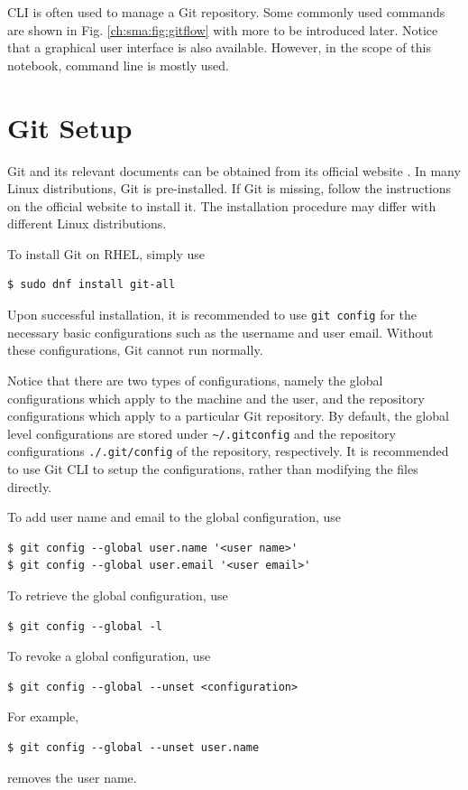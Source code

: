 CLI is often used to manage a Git repository. Some commonly used commands are shown in Fig. \ref{ch:sma:fig:gitflow} with more to be introduced later. Notice that a graphical user interface is also available. However, in the scope of this notebook, command line is mostly used.

\section{Git Setup}

Git and its relevant documents can be obtained from its official website \cite{git2025}. In many Linux distributions, Git is pre-installed. If Git is missing, follow the instructions on the official website to install it. The installation procedure may differ with different Linux distributions.

To install Git on RHEL, simply use
\begin{lstlisting}
$ sudo dnf install git-all
\end{lstlisting}

Upon successful installation, it is recommended to use \verb|git config| for the necessary basic configurations such as the username and user email. Without these configurations, Git cannot run normally.

Notice that there are two types of configurations, namely the global configurations which apply to the machine and the user, and the repository configurations which apply to a particular Git repository. By default, the global level configurations are stored under \verb|~/.gitconfig| and the repository configurations \verb|./.git/config| of the repository, respectively. It is recommended to use Git CLI to setup the configurations, rather than modifying the files directly.

To add user name and email to the global configuration, use
\begin{lstlisting}
$ git config --global user.name '<user name>'
$ git config --global user.email '<user email>'
\end{lstlisting}
To retrieve the global configuration, use
\begin{lstlisting}
$ git config --global -l
\end{lstlisting}
To revoke a global configuration, use
\begin{lstlisting}
$ git config --global --unset <configuration>
\end{lstlisting}
For example,
\begin{lstlisting}
$ git config --global --unset user.name
\end{lstlisting}
removes the user name.

